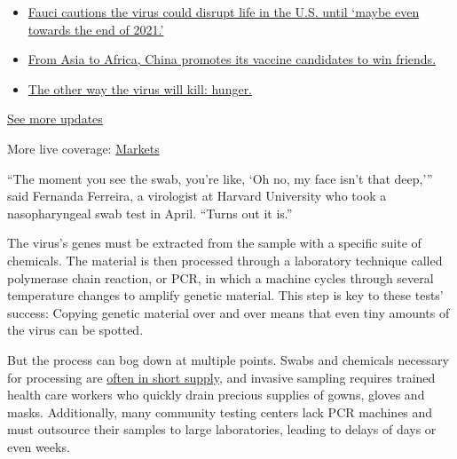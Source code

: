 \begin{itemize}
\tightlist
\item
  \href{https://www.nytimes3xbfgragh.onion/2020/09/11/world/covid-19-coronavirus.html?action=click\&pgtype=Article\&state=default\&region=MAIN_CONTENT_1\&context=storylines_live_updates\#link-dfb8a16}{Fauci
  cautions the virus could disrupt life in the U.S. until `maybe even
  towards the end of 2021.'}
\item
  \href{https://www.nytimes3xbfgragh.onion/2020/09/11/world/covid-19-coronavirus.html?action=click\&pgtype=Article\&state=default\&region=MAIN_CONTENT_1\&context=storylines_live_updates\#link-7104d154}{From
  Asia to Africa, China promotes its vaccine candidates to win friends.}
\item
  \href{https://www.nytimes3xbfgragh.onion/2020/09/11/world/covid-19-coronavirus.html?action=click\&pgtype=Article\&state=default\&region=MAIN_CONTENT_1\&context=storylines_live_updates\#link-393ad215}{The
  other way the virus will kill: hunger.}
\end{itemize}

\href{https://www.nytimes3xbfgragh.onion/2020/09/11/world/covid-19-coronavirus.html?action=click\&pgtype=Article\&state=default\&region=MAIN_CONTENT_1\&context=storylines_live_updates}{See
more updates}

More live coverage:
\href{https://www.nytimes3xbfgragh.onion/live/2020/09/11/business/stock-market-today-coronavirus?action=click\&pgtype=Article\&state=default\&region=MAIN_CONTENT_1\&context=storylines_live_updates}{Markets}

``The moment you see the swab, you're like, `Oh no, my face isn't that
deep,''' said Fernanda Ferreira, a virologist at Harvard University who
took a nasopharyngeal swab test in April. ``Turns out it is.''

The virus's genes must be extracted from the sample with a specific
suite of chemicals. The material is then processed through a laboratory
technique called polymerase chain reaction, or PCR, in which a machine
cycles through several temperature changes to amplify genetic material.
This step is key to these tests' success: Copying genetic material over
and over means that even tiny amounts of the virus can be spotted.

But the process can bog down at multiple points. Swabs and chemicals
necessary for processing are
\href{https://www.nytimes3xbfgragh.onion/2020/03/18/health/coronavirus-test-shortages-face-masks-swabs.html}{often
in short supply}, and invasive sampling requires trained health care
workers who quickly drain precious supplies of gowns, gloves and masks.
Additionally, many community testing centers lack PCR machines and must
outsource their samples to large laboratories, leading to delays of days
or even weeks.

